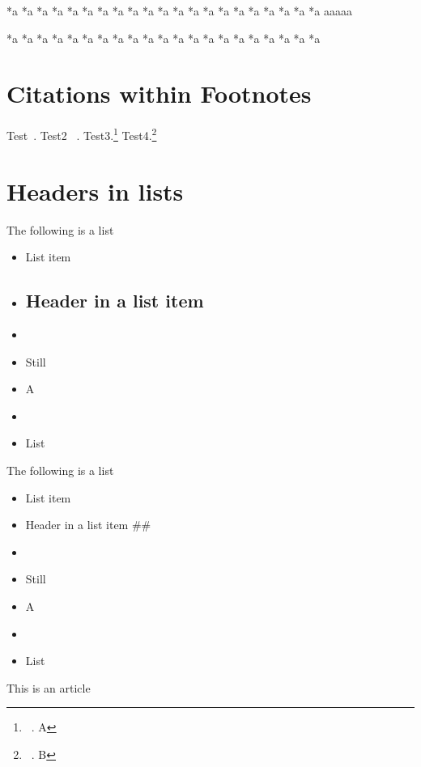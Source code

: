 *a
*a
*a
*a
*a
*a
*a
*a
*a
*a
*a
*a
*a
*a
*a
*a
*a
*a
*a
*a
*a
aaaaa

*a *a *a *a *a *a *a *a *a *a *a *a *a *a *a *a *a *a *a *a *a 

\part{Citations within Footnotes}
\label{citationswithinfootnotes}

Test~\citep{Citekey;}. Test2 ~\citep{Citekey;}. Test3.\footnote{~\citep{Citekey;}. A} Test4.\footnote{~\citep{Citekey;}. B}

\part{Headers in lists}
\label{headersinlists}

The following is a list

\begin{itemize}
\item List item

\item \chapter{Header in a list item}
\label{headerinalistitem}

\item 

\item Still

\item A 

\item 

\item List

\end{itemize}

The following is a list

\begin{itemize}
\item List item

\item Header in a list item \#\#

\item 

\item Still

\item A 

\item 

\item List

\end{itemize}

\begin{thebibliography}{0}

This is an article




\end{thebibliography}




